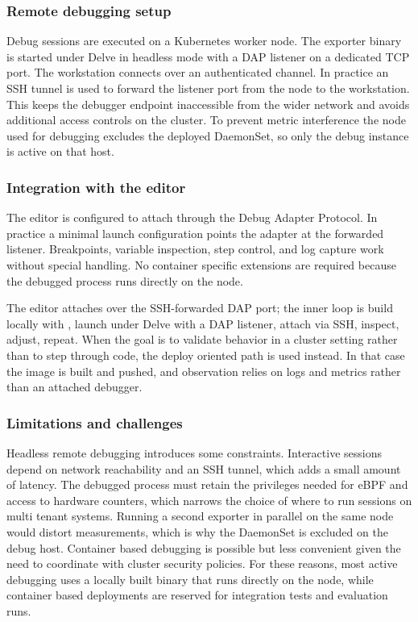 \subsubsection{Remote debugging setup}
\label{subsec:tycho_sysenv_debug_remote}
Debug sessions are executed on a Kubernetes worker node. The exporter binary is started under Delve in headless mode with a DAP listener on a dedicated TCP port. The workstation connects over an authenticated channel. In practice an SSH tunnel is used to forward the listener port from the node to the workstation. This keeps the debugger endpoint inaccessible from the wider network and avoids additional access controls on the cluster. To prevent metric interference the node used for debugging excludes the deployed DaemonSet, so only the debug instance is active on that host.

\subsubsection{Integration with the editor}
\label{subsec:tycho_sysenv_debug_ide}
The editor is configured to attach through the Debug Adapter Protocol. In practice a minimal launch configuration points the adapter at the forwarded listener. Breakpoints, variable inspection, step control, and log capture work without special handling. No container specific extensions are required because the debugged process runs directly on the node.

The editor attaches over the SSH-forwarded DAP port; the inner loop is build locally with , launch under Delve with a DAP listener, attach via SSH, inspect, adjust, repeat. When the goal is to validate behavior in a cluster setting rather than to step through code, the deploy oriented path is used instead. In that case the image is built and pushed, and observation relies on logs and metrics rather than an attached debugger.

\subsubsection{Limitations and challenges}
\label{subsec:tycho_sysenv_debug_limits}
Headless remote debugging introduces some constraints. Interactive sessions depend on network reachability and an SSH tunnel, which adds a small amount of latency. The debugged process must retain the privileges needed for eBPF and access to hardware counters, which narrows the choice of where to run sessions on multi tenant systems. Running a second exporter in parallel on the same node would distort measurements, which is why the DaemonSet is excluded on the debug host. Container based debugging is possible but less convenient given the need to coordinate with cluster security policies. For these reasons, most active debugging uses a locally built binary that runs directly on the node, while container based deployments are reserved for integration tests and evaluation runs.

